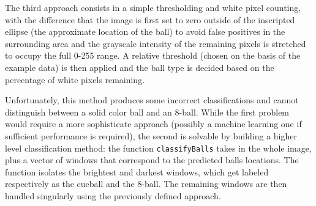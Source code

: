 The third approach consists in a simple thresholding and white pixel 
counting, with the difference that the image is first set to zero 
outside of the inscripted ellipse (the approximate location of the ball)
to avoid false positives in the surrounding area and the grayscale 
intensity of the remaining pixels is stretched to occupy the full 
0-255 range. A relative threshold (chosen on the basis of the example 
data) is then applied and the ball type is decided based on the 
percentage of white pixels remaining.

Unfortunately, this method produces some incorrect classifications 
and cannot distinguish between a solid color ball and an 8-ball. 
While the first problem would require a more sophisticate approach 
(possibly a machine learning one if sufficient performance is 
required), the second is solvable by building a higher level 
classification method: the function \verb|classifyBalls| takes 
in the whole image, plus a vector of windows that correspond to 
the predicted balls locations. 
The function isolates the brightest and darkest windows, which 
get labeled respectively as the cueball and the 8-ball. 
The remaining windows are then handled singularly using the previously 
defined approach.